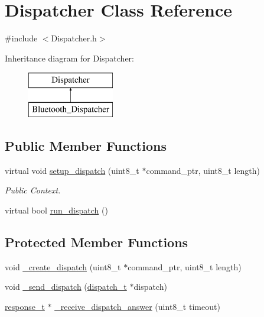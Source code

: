 \hypertarget{class_dispatcher}{\section{\-Dispatcher \-Class \-Reference}
\label{class_dispatcher}
}


{\ttfamily \#include $<$\-Dispatcher.\-h$>$}

\-Inheritance diagram for \-Dispatcher\-:\begin{figure}[H]
\begin{center}
\leavevmode
\includegraphics[height=2.000000cm]{class_dispatcher}
\end{center}
\end{figure}
\subsection*{\-Public \-Member \-Functions}
\begin{DoxyCompactItemize}
\item 
virtual void \hyperlink{class_dispatcher_a2f2dca22ac7a8487399e284499e8095b}{setup\-\_\-dispatch} (uint8\-\_\-t $\ast$command\-\_\-ptr, uint8\-\_\-t length)
\begin{DoxyCompactList}\small\item\em \-Public \-Context. \end{DoxyCompactList}\item 
virtual bool \hyperlink{class_dispatcher_ac94ea7b55709830c5e3eaeaa54afb746}{run\-\_\-dispatch} ()
\end{DoxyCompactItemize}
\subsection*{\-Protected \-Member \-Functions}
\begin{DoxyCompactItemize}
\item 
void \hyperlink{class_dispatcher_ad805b052d0583e25dee170517740b967}{\-\_\-create\-\_\-dispatch} (uint8\-\_\-t $\ast$command\-\_\-ptr, uint8\-\_\-t length)
\item 
void \hyperlink{class_dispatcher_ac0117f0ab105024f5f9342a68a4366c3}{\-\_\-send\-\_\-dispatch} (\hyperlink{structdispatch__t}{dispatch\-\_\-t} $\ast$dispatch)
\item 
\hyperlink{structresponse__t}{response\-\_\-t} $\ast$ \hyperlink{class_dispatcher_ab1eb95d6e4eae7883f696ee19ab71a51}{\-\_\-receive\-\_\-dispatch\-\_\-answer} (uint8\-\_\-t timeout)
\end{DoxyCompactItemize}

